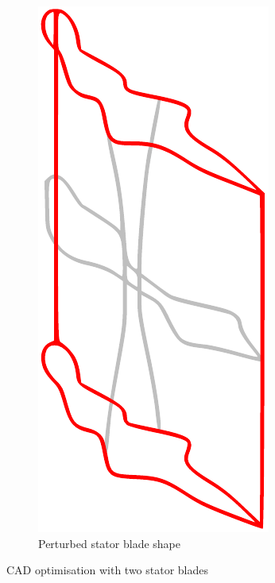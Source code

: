 \documentclass[9pt,academicons]{article}
\begin{document}
\begin{figure}
\begin{subfigure}{.5\textwidth}
  \includegraphics[height=.25\textheight]{img/target-blade.pdf}
  \caption{Perturbed stator blade shape}
\end{subfigure}
\caption{CAD optimisation with two stator blades}
\label{fig:drawtwoblades}
\end{figure}

\end{document}
